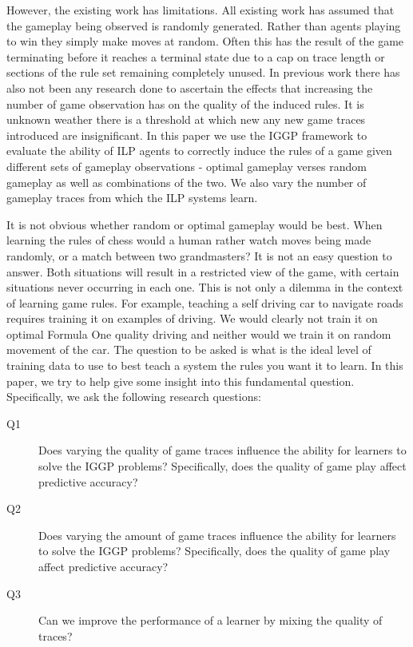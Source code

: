 However, the existing work has limitations. All existing work has assumed that the gameplay being observed is randomly generated. Rather than agents playing to win they simply make moves at random. Often this has the result of the game terminating before it reaches a terminal state due to a cap on trace length or sections of the rule set remaining completely unused. In previous work there has also not been any research done to ascertain the effects that increasing the number of game observation has on the quality of the induced rules. It is unknown weather there is a threshold at which new any new game traces introduced are insignificant. In this paper we use the IGGP framework to evaluate the ability of ILP agents to correctly induce the rules of a game given different sets of gameplay observations - optimal gameplay verses random gameplay as well as combinations of the two. We also vary the number of gameplay traces from which the ILP systems learn.


It is not obvious whether random or optimal gameplay would be best. When learning the rules of chess would a human rather watch moves being made randomly, or a match between two grandmasters? It is not an easy question to answer. Both situations will result in a restricted view of the game, with certain situations never occurring in each one. This is not only a dilemma in the context of learning game rules. For example, teaching a self driving car to navigate roads requires training it on examples of driving. We would clearly not train it on optimal Formula One quality driving and neither would we train it on random movement of the car. The question to be asked is what is the ideal level of training data to use to best teach a system the rules you want it to learn. In this paper, we try to help give some insight into this fundamental question. Specifically, we ask the following research questions:

\begin{description}
\item[Q1] Does varying the quality of game traces influence the ability for learners to solve the IGGP problems? Specifically, does the quality of game play affect predictive accuracy?
\item[Q2] Does varying the amount of game traces influence the ability for learners to solve the IGGP problems? Specifically, does the quality of game play affect predictive accuracy?
\item[Q3] Can we improve the performance of a learner by mixing the quality of traces?
\end{description}

